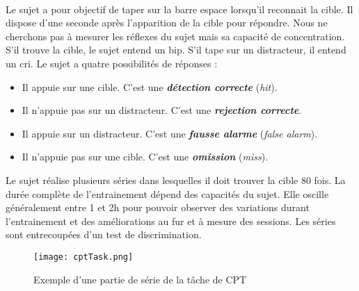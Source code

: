 \paragraph{}Le sujet a pour objectif de taper sur la barre espace lorsqu'il reconnait la cible. Il dispose d'une seconde après l'apparition de la cible pour répondre. Nous ne cherchons
pas à mesurer les réflexes du sujet mais sa capacité de concentration. S'il trouve la cible, le sujet entend un bip. S'il tape sur un distracteur, il entend un cri. Le sujet a quatre
possibilités de réponses :
\begin{itemize}
\item Il appuie sur une cible. C'est une \textbf{\emph{détection correcte}} (\emph{hit}).
\item Il n'appuie pas sur un distracteur. C'est une \textbf{\emph{rejection correcte}}.
\item Il appuie sur un distracteur. C'est une \textbf{\emph{fausse alarme}} (\emph{false alarm}).
\item Il n'appuie pas sur une cible. C'est une \textbf{\emph{omission}} (\emph{miss}).
\end{itemize}
Le sujet réalise plusieurs séries dans lesquelles il doit trouver la cible 80 fois. La durée complète de l'entrainement dépend des capacités du sujet. Elle oscille généralement entre
1 et 2h pour pouvoir observer des variations durant l'entrainement et des améliorations au fur et à mesure des sessions. Les séries sont entrecoupées d'un test de discrimination.

\begin{figure}[H]
    \begin{center}
    \texttt{[image: cptTask.png]}
    \end{center}
    \caption{Exemple d'une partie de série de la tâche de CPT}
\label{CptTask}
\end{figure}

